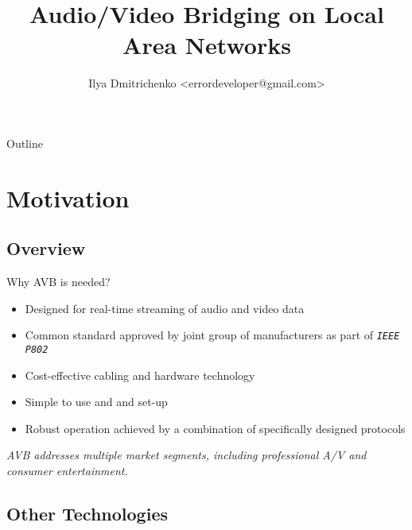 \documentclass{beamer}
\title[AVB]{Audio/Video Bridging on Local Area Networks}
\author[Dmitrichenko, Ilya]{Ilya Dmitrichenko <errordeveloper@gmail.com>}
\institute[London Metropolitan University]{}
\date[\today]
\begin{document}
\begin{frame}
	\titlepage
\end{frame}

\begin{frame}{Outline}
	\tableofcontents[pausesections]
\end{frame}


\section{Motivation}

\subsection{Overview}

\begin{frame}{ Why AVB is needed? }

\begin{itemize}
	\item Designed for real-time streaming of audio and video data
	\item Common standard approved by joint group \newline of manufacturers as part of \emph{\texttt{IEEE P802}}
	\item Cost-effective cabling and hardware technology
	\item Simple to use and and set-up
	\item Robust operation achieved by a combination \newline of specifically designed protocols
\end{itemize}

\emph{ AVB addresses multiple market segments, \newline including professional A/V and consumer entertainment. }

\end{frame}


\subsection{Other Technologies}
\end{document}
